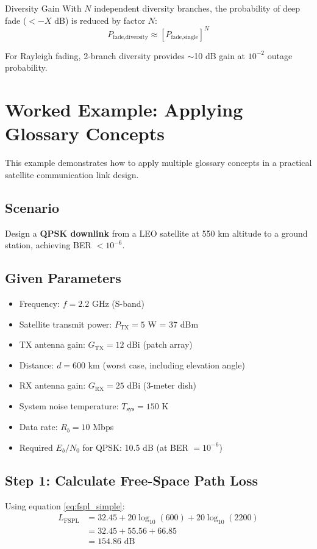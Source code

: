 \begin{calloutbox}{Diversity Gain}
With $N$ independent diversity branches, the probability of deep fade ($< -X$ dB) is reduced by factor $N$:
\begin{equation}
P_{\text{fade,diversity}} \approx [P_{\text{fade,single}}]^N
\end{equation}

For Rayleigh fading, 2-branch diversity provides $\sim$10 dB gain at $10^{-2}$ outage probability.
\end{calloutbox}

\section{Worked Example: Applying Glossary Concepts}

This example demonstrates how to apply multiple glossary concepts in a practical satellite communication link design.

\subsection*{Scenario}
Design a \textbf{QPSK downlink} from a LEO satellite at 550 km altitude to a ground station, achieving BER $< 10^{-6}$.

\subsection*{Given Parameters}
\begin{itemize}
\item Frequency: $f = 2.2$ GHz (S-band)
\item Satellite transmit power: $P_{\text{TX}} = 5$ W = 37 dBm
\item TX antenna gain: $G_{\text{TX}} = 12$ dBi (patch array)
\item Distance: $d = 600$ km (worst case, including elevation angle)
\item RX antenna gain: $G_{\text{RX}} = 25$ dBi (3-meter dish)
\item System noise temperature: $T_{\text{sys}} = 150$ K
\item Data rate: $R_b = 10$ Mbps
\item Required $E_b/N_0$ for QPSK: 10.5 dB (at BER $= 10^{-6}$)
\end{itemize}

\subsection*{Step 1: Calculate Free-Space Path Loss}
Using equation \eqref{eq:fspl_simple}:
\begin{align}
L_{\text{FSPL}} &= 32.45 + 20\log_{10}(600) + 20\log_{10}(2200) \nonumber\\
&= 32.45 + 55.56 + 66.85 \nonumber\\
&= 154.86 \text{ dB}
\end{align}

